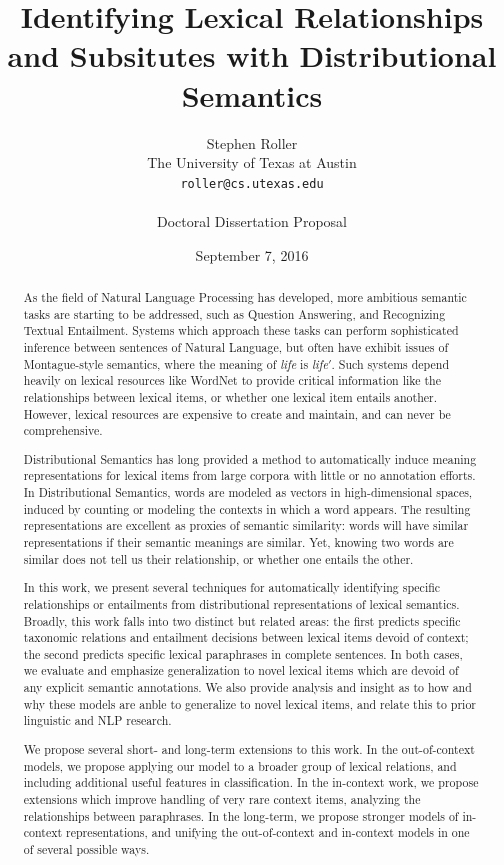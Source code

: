 \documentclass[letterpaper]{article}
\title{Identifying Lexical Relationships and Subsitutes with Distributional Semantics}
\author{Stephen Roller\\
The University of Texas at Austin\\
{\tt roller@cs.utexas.edu}\\
\\
Doctoral Dissertation Proposal}
\date{September 7, 2016}
\begin{document}
\maketitle

\begin{abstract}
  As the field of Natural Language Processing has developed, more ambitious
  semantic tasks are starting to be addressed, such as Question Answering, and
  Recognizing Textual Entailment. Systems which approach these tasks can
  perform sophisticated inference between sentences of Natural Language, but
  often have exhibit issues of Montague-style semantics, where the meaning of
  {\em life} is {\em life$'$}. Such systems depend heavily on lexical resources
  like WordNet to provide critical information like the relationships between
  lexical items, or whether one lexical item entails another. However, lexical
  resources are expensive to create and maintain, and can never be
  comprehensive.

  Distributional Semantics has long provided a method to automatically induce
  meaning representations for lexical items from large corpora with little or
  no annotation efforts. In Distributional Semantics, words are modeled as
  vectors in high-dimensional spaces, induced by counting or modeling the
  contexts in which a word appears. The resulting representations are excellent
  as proxies of semantic similarity: words will have similar representations if
  their semantic meanings are similar. Yet, knowing two words are similar does
  not tell us their relationship, or whether one entails the other.

  In this work, we present several techniques for automatically identifying
  specific relationships or entailments from distributional representations of
  lexical semantics. Broadly, this work falls into two distinct but related
  areas: the first predicts specific taxonomic relations and entailment
  decisions between lexical items devoid of context;
  the second predicts specific lexical paraphrases in complete sentences. In
  both cases, we evaluate and emphasize generalization to novel lexical items
  which are devoid of any explicit semantic annotations.  We also provide
  analysis and insight as to how and why these models are anble to generalize
  to novel lexical items, and relate this to prior linguistic and NLP research.

  We propose several short- and long-term extensions to this work. In the
  out-of-context models, we propose applying our model to a broader group of
  lexical relations, and including additional useful features in
  classification.  In the in-context work, we propose extensions which improve
  handling of very rare context items, analyzing the relationships between
  paraphrases. In the long-term, we propose stronger models of in-context
  representations, and unifying the out-of-context and in-context models in
  one of several possible ways.
\end{abstract}
\end{document}
